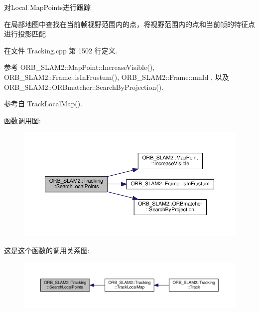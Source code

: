 对\-Local Map\-Points进行跟踪 

在局部地图中查找在当前帧视野范围内的点，将视野范围内的点和当前帧的特征点进行投影匹配 

在文件 Tracking.\-cpp 第 1502 行定义.



参考 O\-R\-B\-\_\-\-S\-L\-A\-M2\-::\-Map\-Point\-::\-Increase\-Visible(), O\-R\-B\-\_\-\-S\-L\-A\-M2\-::\-Frame\-::is\-In\-Frustum(), O\-R\-B\-\_\-\-S\-L\-A\-M2\-::\-Frame\-::mn\-Id , 以及 O\-R\-B\-\_\-\-S\-L\-A\-M2\-::\-O\-R\-Bmatcher\-::\-Search\-By\-Projection().



参考自 Track\-Local\-Map().



函数调用图\-:
\nopagebreak
\begin{figure}[H]
\begin{center}
\leavevmode
\includegraphics[width=350pt]{classORB__SLAM2_1_1Tracking_a451c0e5372c24645c7634fcebc8fa847_cgraph}
\end{center}
\end{figure}




这是这个函数的调用关系图\-:
\nopagebreak
\begin{figure}[H]
\begin{center}
\leavevmode
\includegraphics[width=350pt]{classORB__SLAM2_1_1Tracking_a451c0e5372c24645c7634fcebc8fa847_icgraph}
\end{center}
\end{figure}


